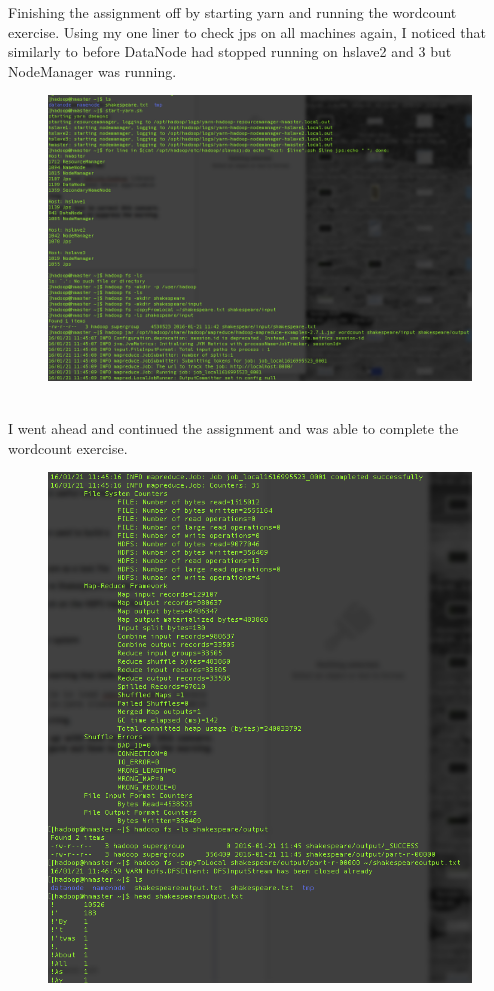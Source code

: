 \documentclass[10pt]{article}
\begin{document}
Finishing the assignment off by starting yarn and running the wordcount exercise. Using my one liner to check jps on all machines again, I noticed that similarly to before DataNode had stopped running on hslave2 and 3 but NodeManager was running.\pagebreak
\begin{figure}[!h]
\includegraphics[scale=0.37]{wordcount1.png}
\centering
\end{figure}\\
I went ahead and continued the assignment and was able to complete the wordcount exercise.
\begin{figure}[!h]
\includegraphics[scale=0.37]{wordcount2.png}
\centering
\end{figure}\\
\end{document}
